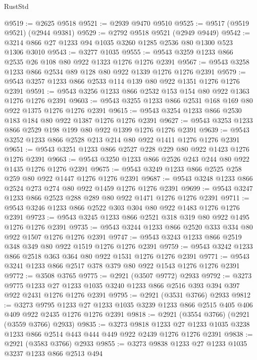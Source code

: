 \begin{lexlean}{RustStd}
\begin{coremodule}
@9519 := @2625 @9518
@9521 := @2939 @9470 @9510
@9525 := @9517 (@9519 @9521) (@2944 @9381)
@9529 := @2792 @9518 @9521 (@2949 @9449)
@9542 := @3214 @866 @27 @1233 @94 @1035 @3260 @1285 @2536 @80 @1300 @523 @1306 @3010
@9543 := @3277 @1035
@9555 := @9543 @3259 @1233 @866 @2535 @26 @108 @80 @922 @1323 @1276 @1276 @2391
@9567 := @9543 @3258 @1233 @866 @2534 @89 @128 @80 @922 @1339 @1276 @1276 @2391
@9579 := @9543 @3257 @1233 @866 @2533 @114 @139 @80 @922 @1351 @1276 @1276 @2391
@9591 := @9543 @3256 @1233 @866 @2532 @153 @154 @80 @922 @1363 @1276 @1276 @2391
@9603 := @9543 @3255 @1233 @866 @2531 @168 @169 @80 @922 @1375 @1276 @1276 @2391
@9615 := @9543 @3254 @1233 @866 @2530 @183 @184 @80 @922 @1387 @1276 @1276 @2391
@9627 := @9543 @3253 @1233 @866 @2529 @198 @199 @80 @922 @1399 @1276 @1276 @2391
@9639 := @9543 @3252 @1233 @866 @2528 @213 @214 @80 @922 @1411 @1276 @1276 @2391
@9651 := @9543 @3251 @1233 @866 @2527 @228 @229 @80 @922 @1423 @1276 @1276 @2391
@9663 := @9543 @3250 @1233 @866 @2526 @243 @244 @80 @922 @1435 @1276 @1276 @2391
@9675 := @9543 @3249 @1233 @866 @2525 @258 @259 @80 @922 @1447 @1276 @1276 @2391
@9687 := @9543 @3248 @1233 @866 @2524 @273 @274 @80 @922 @1459 @1276 @1276 @2391
@9699 := @9543 @3247 @1233 @866 @2523 @288 @289 @80 @922 @1471 @1276 @1276 @2391
@9711 := @9543 @3246 @1233 @866 @2522 @303 @304 @80 @922 @1483 @1276 @1276 @2391
@9723 := @9543 @3245 @1233 @866 @2521 @318 @319 @80 @922 @1495 @1276 @1276 @2391
@9735 := @9543 @3244 @1233 @866 @2520 @333 @334 @80 @922 @1507 @1276 @1276 @2391
@9747 := @9543 @3243 @1233 @866 @2519 @348 @349 @80 @922 @1519 @1276 @1276 @2391
@9759 := @9543 @3242 @1233 @866 @2518 @363 @364 @80 @922 @1531 @1276 @1276 @2391
@9771 := @9543 @3241 @1233 @866 @2517 @378 @379 @80 @922 @1543 @1276 @1276 @2391
@9772 := @3508 @3765
@9775 := @2921 (@3507 @9772) @2933
@9792 := @3273
    @9775
    @1233
    @27
    @1233
    @1035
    @3240
    @1233
    @866
    @2516
    @393
    @394
    @397
    @922
    @2431
    @1276
    @1276
    @2391
@9795 := @2921 (@3531 @3766) @2933
@9812 := @3273
    @9795
    @1233
    @27
    @1233
    @1035
    @3239
    @1233
    @866
    @2515
    @405
    @406
    @409
    @922
    @2435
    @1276
    @1276
    @2391
@9818 := @2921 (@3554 @3766) (@2921 (@3559 @3766) @2933)
@9835 := @3273
    @9818
    @1233
    @27
    @1233
    @1035
    @3238
    @1233
    @866
    @2514
    @443
    @444
    @449
    @922
    @2439
    @1276
    @1276
    @2391
@9838 := @2921 (@3583 @3766) @2933
@9855 := @3273
    @9838
    @1233
    @27
    @1233
    @1035
    @3237
    @1233
    @866
    @2513
    @494

\end{coremodule}
\end{lexlean}
